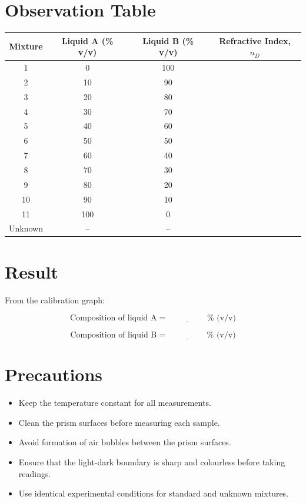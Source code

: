 \documentclass[12pt]{article}
\begin{document}
	\section*{Observation Table}
	
	\begin{center}
		\begin{tabular}{cccc}
			\toprule
			Mixture & Liquid A (\% v/v) & Liquid B (\% v/v) &
			Refractive Index, \(n_D\) \\
			\midrule
			1 & 0   & 100 & \\
			2 & 10   & 90 & \\
			3 & 20   & 80 & \\
			4 & 30   & 70 & \\
			5 & 40   & 60 & \\
			6 & 50  & 50  & \\
			7 & 60  & 40  & \\
			8 & 70  & 30  & \\
			9 & 80  & 20  & \\
			10 & 90   & 10 & \\
			11 & 100 & 0   & \\
			Unknown & -- & -- & \\
			\bottomrule
		\end{tabular}
	\end{center}
	
	\section*{Result}
	
	From the calibration graph:
	
	\[
	\text{Composition of liquid A} = \underline{\hspace{2cm}} \% \text{ (v/v)}
	\]
	
	\[
	\text{Composition of liquid B} = \underline{\hspace{2cm}} \% \text{ (v/v)}
	\]
	
	\section*{Precautions}
	
	\begin{itemize}
		\item Keep the temperature constant for all measurements.
		\item Clean the prism surfaces before measuring each sample.
		\item Avoid formation of air bubbles between the prism surfaces.
		\item Ensure that the light-dark boundary is sharp and colourless before taking readings.
		\item Use identical experimental conditions for standard and unknown mixtures.
	\end{itemize}
	
\end{document}
